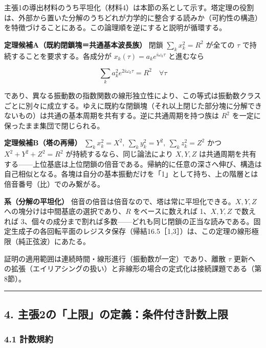 \documentclass[
  a4paper,
]{ltjsarticle}
\begin{document}
主張1の導出材料のうち平坦化（材料4）は本節の系として示す。塔定理の役割は、外部から置いた分解のうちどれが力学的に整合する読みか（可約性の構造）を特徴づけることにある。この論理順を逆にすると説明が循環する。

\textbf{定理候補A（既約閉鎖塊＝共通基本波長族）} 閉鎖
\(\sum_k x_k^2=R^2\) が全ての \(\tau\)
で持続することを要求する。各成分が \(x_k(\tau)=a_ke^{i\omega_k\tau}\)
と進むなら

\[
\sum_k a_k^2 e^{2i\omega_k\tau}=R^2\quad\forall\tau
\]

であり、異なる振動数の指数関数の線形独立性により、この等式は振動数クラスごとに別々に成立する。ゆえに既約な閉鎖塊（それ以上閉じた部分塊に分解できないもの）は共通の基本周期を共有する。逆に共通周期を持つ族は
\(R^2\) を一定に保ったまま集団で閉じられる。

\textbf{定理候補B（塔の再帰）}
\(\sum_k x_k^2=X^2,\ \sum_k y_k^2=Y^2,\ \sum_k z_k^2=Z^2\) かつ
\(X^2+Y^2+Z^2=R^2\) が持続するなら、同じ論法により \(X,Y,Z\)
は共通周期を共有する------上位基底は上位閉鎖の倍音である。帰納的に任意の深さへ伸び、構造は自己相似となる。各塊は自分の基本振動だけを「1」として持ち、上の階層とは倍音番号（比）でのみ繋がる。

\textbf{系（分解の平坦化）}
倍音の倍音は倍音なので、塔は常に平坦化できる。\(X,Y,Z\)
への塊分けは中間基底の選択であり、\(R\) をベースに数えれば 1、\(X,Y,Z\)
で数えれば
3、個々の成分まで割れば多数------どれも同じ閉鎖の正当な読みである。固定生成子の各回転平面のレジスタ保存（帰結16.5［1,3］）は、この定理の線形極限（純正弦波）にあたる。

証明の適用範囲は連続時間・線形進行（振動数が一定）であり、離散 \(\tau\)
更新への拡張（エイリアシングの扱い）と非線形の場合の定式化は接続課題である（第8節）。

\begin{center}\rule{0.5\linewidth}{0.5pt}\end{center}

\subsection{4.
主張2の「上限」の定義：条件付き計数上限}\label{ux4e3bux5f352ux306eux4e0aux9650ux306eux5b9aux7fa9ux6761ux4ef6ux4ed8ux304dux8a08ux6570ux4e0aux9650}

\subsubsection{4.1 計数規約}\label{ux8a08ux6570ux898fux7d04}
\end{document}
